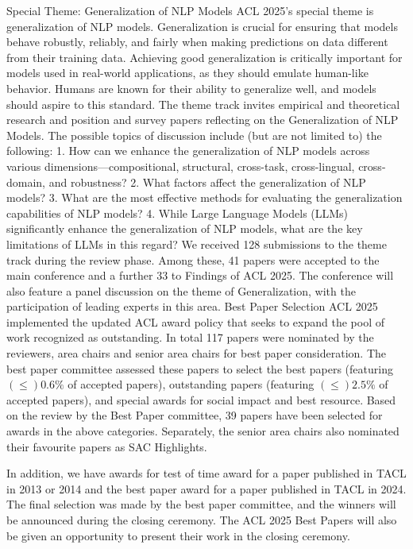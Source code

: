 Special Theme: Generalization of NLP Models
ACL 2025's special theme is generalization of NLP models. Generalization is crucial for ensuring that models behave robustly, reliably, and fairly when making predictions on data different from their training data. Achieving good generalization is critically important for models used in real-world applications, as they should emulate human-like behavior. Humans are known for their ability to generalize well, and models should aspire to this standard. The theme track invites empirical and theoretical research and position and survey papers reflecting on the Generalization of NLP Models. The possible topics of discussion include (but are not limited to) the following:
1. How can we enhance the generalization of NLP models across various dimensions—compositional, structural, cross-task, cross-lingual, cross-domain, and robustness?
2. What factors affect the generalization of NLP models?
3. What are the most effective methods for evaluating the generalization capabilities of NLP models?
4. While Large Language Models (LLMs) significantly enhance the generalization of NLP models, what are the key limitations of LLMs in this regard?
We received 128 submissions to the theme track during the review phase. Among these, 41 papers were accepted to the main conference and a further 33 to Findings of ACL 2025. The conference will also feature a panel discussion on the theme of Generalization, with the participation of leading experts in this area.
Best Paper Selection
ACL 2025 implemented the updated ACL award policy that seeks to expand the pool
of work recognized as outstanding. In total 117 papers were nominated by the reviewers, area chairs and senior area chairs for best paper consideration. The best paper committee assessed these papers to select the best papers (featuring $(\leq)0.6\%$ of accepted papers), outstanding papers (featuring $(\leq)2.5\%$ of accepted papers), and special awards for social impact and best resource.  Based on the review by the Best Paper committee, 39 papers have been selected for awards in the above categories. Separately, the senior area chairs also nominated their favourite papers as SAC Highlights.

In addition, we have awards for test of time award for a paper published in TACL in 2013 or 2014 and the best paper award for a paper published in TACL in 2024. The final selection was made by the best paper committee, and the winners will be announced during the closing ceremony. The ACL 2025 Best Papers will also be given an opportunity to present their work in the closing ceremony.

